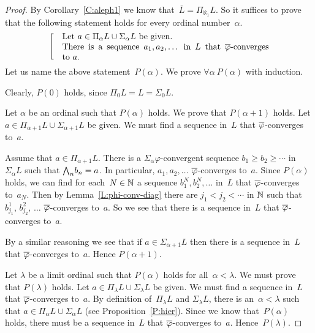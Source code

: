 \documentclass[main.tex]{subfiles}
\begin{document}
\begin{proof}
By Corollary~\ref{C:aleph1}
we know that~$\overline L = \Pi_{\aleph_1} L$.
So it suffices to prove that
the following statement holds for every ordinal number~$\alpha$.
\begin{equation*}
\left[\quad
\begin{minipage}{.7\columnwidth}
Let $a\in \Pi_\alpha L\cup \Sigma_\alpha L$ be given.\\
There is a sequence $a_1,a_2,\dotsc$ in~$L$
that $\ol\varphi$-converges to~$a$.
\end{minipage}
\right.
\end{equation*}
Let us name the above statement~$P(\alpha)$.
We prove $\forall\alpha\ P(\alpha)$ with induction.

Clearly, $P(0)$ holds,
since $\Pi_0 L = L = \Sigma_0 L$.

\vspace{.3em}
Let $\alpha$ be an ordinal  such that $P(\alpha)$ holds.
We prove that $P(\alpha+1)$ holds.
Let $a\in \Pi_{\alpha+1}L \cup \Sigma_{\alpha+1} L$ be given.
We must find a sequence in~$L$ that
$\overline\varphi$-converges to~$a$.

Assume that $a\in \Pi_{\alpha+1} L$.
There is a $\Sigma_\alpha\varphi$-convergent
sequence $b_1 \geq b_2 \geq \dotsb$ in $\Sigma_\alpha L$
such that $\textstyle{\bigwedge}_n b_n = a$.
In particular, $a_1,a_2,\dotsc$ $\overline\varphi$-converges to~$a$.
Since $P(\alpha)$ holds,
we can find for each~$N\in \mathbb{N}$ a
sequence $b^N_1, b^N_2,\dotsc$ in~$L$
that $\overline\varphi$-converges to~$a_N$.
Then by Lemma~\ref{L:phi-conv-diag}
there are $j_1 < j_2 < \dotsb$ in $\mathbb{N}$
such that $b^1_{j_1},\, b^2_{j_2},\,\dotsc$
$\overline\varphi$-converges to~$a$.
So we see that there is a sequence in~$L$
that $\overline\varphi$-converges to~$a$.

By a similar reasoning
we see that if $a\in \Sigma_{\alpha+1}L$
then there is a sequence in~$L$ 
that $\overline\varphi$-converges to~$a$.
Hence $P(\alpha+1)$.

\vspace{.3em}
Let $\lambda$ be a limit ordinal
such that $P(\alpha)$ holds
for all~$\alpha<\lambda$.
We must prove that $P(\lambda)$ holds.
Let $a\in \Pi_\lambda L\cup \Sigma_\lambda L$ be given.
We must find a sequence in~$L$ that $\overline\varphi$-converges to~$a$.
By definition of~$\Pi_\lambda L$ and $\Sigma_\lambda L$,
there is an~$\alpha<\lambda$
such that $a \in \Pi_\alpha L \cup \Sigma_\alpha L$
(see Proposition~\ref{P:hier}).
Since we know that~$P(\alpha)$ holds,
there must be a sequence in~$L$ that $\overline\varphi$-converges to~$a$.
Hence~$P(\lambda)$.
\end{proof}
\end{document}
